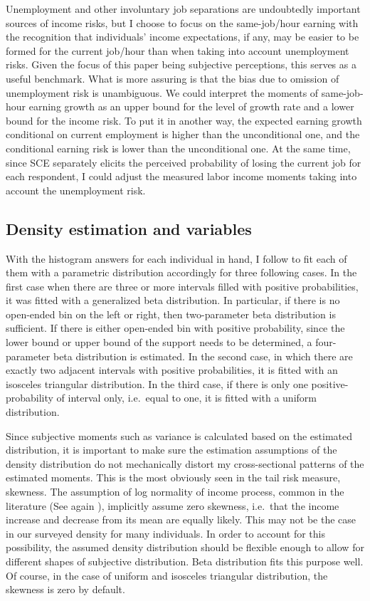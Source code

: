 \documentclass[12pt,notitlepage,onecolumn,aps,pra]{article}
\begin{document}
Unemployment and other involuntary job separations are undoubtedly
important sources of income risks, but I choose to focus on the
same-job/hour earning with the recognition that individuals' income
expectations, if any, may be easier to be formed for the current
job/hour than when taking into account unemployment risks. Given the
focus of this paper being subjective perceptions, this serves as a
useful benchmark. What is more assuring is that the bias due to omission
of unemployment risk is unambiguous. We could interpret the moments of
same-job-hour earning growth as an upper bound for the level of growth
rate and a lower bound for the income risk. To put it in another way,
the expected earning growth conditional on current employment is higher
than the unconditional one, and the conditional earning risk is lower
than the unconditional one. At the same time, since SCE separately
elicits the perceived probability of losing the current job for each
respondent, I could adjust the measured labor income moments taking into
account the unemployment risk.

\hypertarget{density-estimation-and-variables}{%
\subsection{Density estimation and
variables}\label{density-estimation-and-variables}}

With the histogram answers for each individual in hand, I follow
\cite{engelberg_comparing_2009} to fit each of them with a parametric
distribution accordingly for three following cases. In the first case
when there are three or more intervals filled with positive
probabilities, it was fitted with a generalized beta distribution. In
particular, if there is no open-ended bin on the left or right, then
two-parameter beta distribution is sufficient. If there is either
open-ended bin with positive probability, since the lower bound or upper
bound of the support needs to be determined, a four-parameter beta
distribution is estimated. In the second case, in which there are
exactly two adjacent intervals with positive probabilities, it is fitted
with an isosceles triangular distribution. In the third case, if there
is only one positive-probability of interval only, i.e.~equal to one, it
is fitted with a uniform distribution.

Since subjective moments such as variance is calculated based on the
estimated distribution, it is important to make sure the estimation
assumptions of the density distribution do not mechanically distort my
cross-sectional patterns of the estimated moments. This is the most
obviously seen in the tail risk measure, skewness. The assumption of log
normality of income process, common in the literature (See again
\cite{blundell_consumption_2008}), implicitly assume zero skewness,
i.e.~that the income increase and decrease from its mean are equally
likely. This may not be the case in our surveyed density for many
individuals. In order to account for this possibility, the assumed
density distribution should be flexible enough to allow for different
shapes of subjective distribution. Beta distribution fits this purpose
well. Of course, in the case of uniform and isosceles triangular
distribution, the skewness is zero by default.
\end{document}
